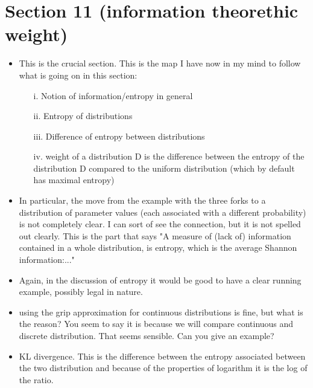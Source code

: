 \documentclass[
  10pt,
  dvipsnames,enabledeprecatedfontcommands]{scrartcl}
\begin{document}
\hypertarget{section-11-information-theorethic-weight}{%
\section{Section 11 (information theorethic
weight)}\label{section-11-information-theorethic-weight}}

\begin{itemize}

\item This is the crucial section. This is the map I have now in my mind to 
follow what is going on in this section: 


\begin{enumerate}
\item[i.] Notion of information/entropy in general
\item[ii.] Entropy of distributions
\item[iii.] Difference of entropy between distributions
\item[iv.] weight of a distribution D is the difference between the entropy of the distribution D compared to the uniform distribution (which by default has maximal entropy)
\end{enumerate}

\item In particular, the move from the example with the three forks to
a distribution of parameter values (each associated with a different probability) 
is not completely clear. I can sort of see the connection, 
but it is not spelled out clearly. This is the part that says "A measure of (lack of) information contained in a whole distribution, is entropy, which is the average Shannon information:..."

\item Again, in the discussion of entropy it would be 
good to have a clear running example, possibly 
legal in nature. 

\item using the grip approximation for continuous distributions is fine, 
but what is the reason? You seem to say it is because we will compare continuous 
and discrete distribution. That seems sensible. Can you give an example?

\item KL divergence. This is the difference between the entropy associated between the two distribution and because of the properties of logarithm it is the log of the ratio. 


\end{itemize}
\end{document}
